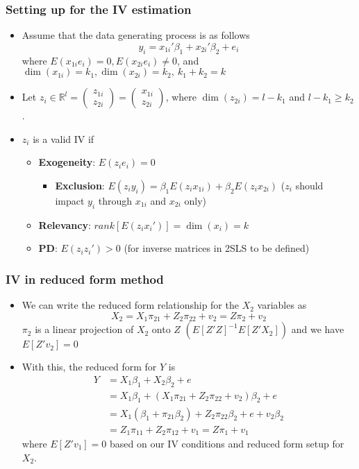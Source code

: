 \documentclass[aspectratio=169]{beamer}
\begin{document}
\begin{frame}
\frametitle{Setting up for the IV estimation}
\begin{itemize} 
\item Assume that the data generating process is as follows
\[
y_i = x_{1i}'\beta_1+x_{2i}'\beta_2+e_i
\]
where $E(x_{1i}e_i)=0, E(x_{2i}e_i)\neq0$, and $\dim(x_{1i})=k_1, \dim(x_{2i})=k_2,\ k_1+k_2=k$
\item Let $z_i\in\mathbb{R}^l = \begin{pmatrix}z_{1i} \\ z_{2i}\end{pmatrix}=\begin{pmatrix}x_{1i} \\ z_{2i}\end{pmatrix}$, where $\dim(z_{2i})=l-k_1$ and $l-k_1\geq k_2$.
\item $z_i$ is a valid IV if
\begin{itemize}
\item \textbf{Exogeneity}: $E(z_ie_i)=0$
\begin{itemize}
\item \textbf{Exclusion}: $E(z_iy_i)=\beta_1E(z_ix_{1i})+\beta_2E(z_ix_{2i})$ ($z_i$ should impact $y_i$ through $x_{1i}$ and $x_{2i}$ only)
\end{itemize}
\item \textbf{Relevancy}: $rank[E(z_ix_i')]=\dim(x_i)=k$
\item \textbf{PD}: $E(z_iz_i')>0$ (for inverse matrices in 2SLS to be defined)
\end{itemize}
\end{itemize}
\end{frame}

\begin{frame}
\frametitle{IV in reduced form method}
\begin{itemize} 
\item We can write the reduced form relationship for the $X_2$ variables as
\[
X_2 = X_1\pi_{21} + Z_2\pi_{22}+v_2 = Z\pi_2+v_2
\]
$\pi_2$ is a linear projection of $X_2$ onto $Z$ $\left(E[Z'Z]^{-1}E[Z'X_2]\right)$ and we have $E[Z'v_2]=0$
\item With this, the reduced form for $Y$ is
\[
\begin{aligned}
Y&=X_1\beta_1+X_2\beta_2+e\\
&=X_1\beta_1+(X_1\pi_{21} + Z_2\pi_{22}+v_2)\beta_2+e\\
&=X_1(\beta_1+\pi_{21}\beta_2)+Z_2\pi_{22}\beta_2+e+v_2\beta_2\\
&=Z_1\pi_{11}+Z_2\pi_{12}+v_1 = Z\pi_1+v_1
\end{aligned}
\]
where $E[Z'v_1]=0$ based on our IV conditions and reduced form setup for $X_2$. 
\end{itemize}
\end{frame}
\end{document}

